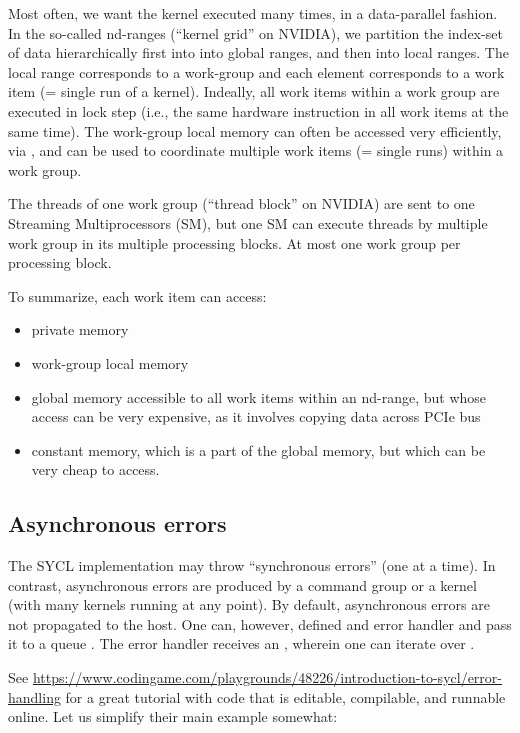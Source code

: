 Most often, we want the kernel executed many times, in a data-parallel fashion. 
In the so-called nd-ranges (``kernel grid'' on NVIDIA), we partition the index-set of data hierarchically first into into global ranges, and then into local ranges. 
The local range corresponds to a work-group and each element corresponds to a work item (= single run of a kernel). 
Indeally, all work items within a work group are executed in lock step (i.e., the same hardware instruction in all work items at the same time).
The work-group local memory can often be accessed very efficiently, via , and can be used to coordinate multiple work items (= single runs) within a work group.

The threads of one work group (``thread block'' on NVIDIA) are sent to one Streaming Multiprocessors (SM), but one SM can execute threads by multiple work group in its multiple processing blocks. At most one work group per processing block.

To summarize, each work item can access:
\begin{itemize}
\item private memory
\item work-group local memory
\item global memory accessible to all work items within an nd-range, but whose access can be very expensive, as it involves copying data across PCIe bus
\item constant memory, which is a part of the global memory, but which can be very cheap to access. 
\end{itemize}

\subsection{Asynchronous errors}

The SYCL implementation may throw ``synchronous errors'' (one at a time).
In contrast, asynchronous errors are produced by a command group or a kernel (with many kernels running at any point). By default, asynchronous errors are not propagated to the host. One can, however, defined and error handler and pass it to a queue .
The error handler receives an , wherein one can iterate over .

See \url{https://www.codingame.com/playgrounds/48226/introduction-to-sycl/error-handling} for a great tutorial with code that is editable, compilable, and runnable online. Let us simplify their main example somewhat:

